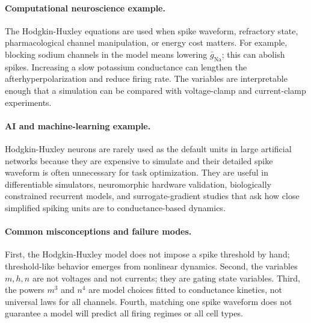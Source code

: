\paragraph{Computational neuroscience example.}
The Hodgkin-Huxley equations are used when spike waveform, refractory state, pharmacological channel manipulation, or energy cost matters. For example, blocking sodium channels in the model means lowering \(\bar g_{\mathrm{Na}}\); this can abolish spikes. Increasing a slow potassium conductance can lengthen the afterhyperpolarization and reduce firing rate. The variables are interpretable enough that a simulation can be compared with voltage-clamp and current-clamp experiments.

\paragraph{AI and machine-learning example.}
Hodgkin-Huxley neurons are rarely used as the default units in large artificial networks because they are expensive to simulate and their detailed spike waveform is often unnecessary for task optimization. They are useful in differentiable simulators, neuromorphic hardware validation, biologically constrained recurrent models, and surrogate-gradient studies that ask how close simplified spiking units are to conductance-based dynamics.

\paragraph{Common misconceptions and failure modes.}
First, the Hodgkin-Huxley model does not impose a spike threshold by hand; threshold-like behavior emerges from nonlinear dynamics. Second, the variables \(m,h,n\) are not voltages and not currents; they are gating state variables. Third, the powers \(m^3\) and \(n^4\) are model choices fitted to conductance kinetics, not universal laws for all channels. Fourth, matching one spike waveform does not guarantee a model will predict all firing regimes or all cell types.

